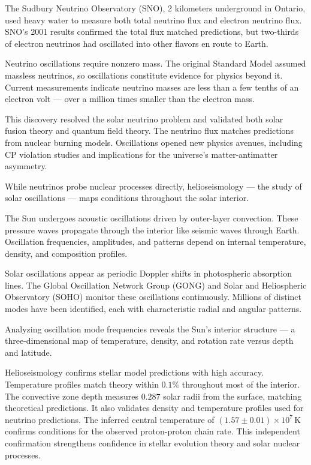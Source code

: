 The Sudbury Neutrino Observatory (SNO), 2 kilometers underground in Ontario, used heavy water to measure both total neutrino flux and electron neutrino flux. SNO's 2001 results confirmed the total flux matched predictions, but two-thirds of electron neutrinos had oscillated into other flavors en route to Earth.

Neutrino oscillations require nonzero mass. The original Standard Model assumed massless neutrinos, so oscillations constitute evidence for physics beyond it. Current measurements indicate neutrino masses are less than a few tenths of an electron volt — over a million times smaller than the electron mass.

This discovery resolved the solar neutrino problem and validated both solar fusion theory and quantum field theory. The neutrino flux matches predictions from nuclear burning models. Oscillations opened new physics avenues, including CP violation studies and implications for the universe's matter-antimatter asymmetry.

While neutrinos probe nuclear processes directly, helioseismology — the study of solar oscillations — maps conditions throughout the solar interior.

The Sun undergoes acoustic oscillations driven by outer-layer convection. These pressure waves propagate through the interior like seismic waves through Earth. Oscillation frequencies, amplitudes, and patterns depend on internal temperature, density, and composition profiles.

Solar oscillations appear as periodic Doppler shifts in photospheric absorption lines. The Global Oscillation Network Group (GONG) and Solar and Heliospheric Observatory (SOHO) monitor these oscillations continuously. Millions of distinct modes have been identified, each with characteristic radial and angular patterns.

Analyzing oscillation mode frequencies reveals the Sun's interior structure — a three-dimensional map of temperature, density, and rotation rate versus depth and latitude.

Helioseismology confirms stellar model predictions with high accuracy. Temperature profiles match theory within $0.1\%$ throughout most of the interior. The convective zone depth measures $0.287$ solar radii from the surface, matching theoretical predictions. It also validates density and temperature profiles used for neutrino predictions. The inferred central temperature of $(1.57 \pm 0.01) \times 10^7\,\text{K}$ confirms conditions for the observed proton-proton chain rate. This independent confirmation strengthens confidence in stellar evolution theory and solar nuclear processes.

